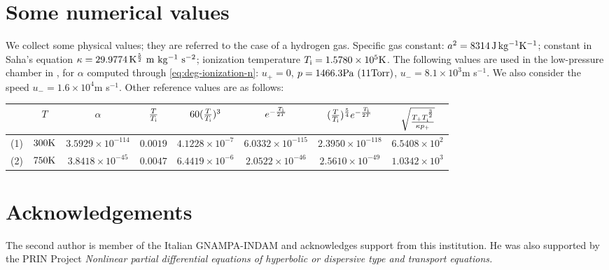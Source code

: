 \documentclass[10pt,a4paper]{article}
\numberwithin{equation}{section}
\newcommand{\Ti}{T_{\rm i}}
\begin{document}
\appendix
\section{Some numerical values}\label{sec:appendix_numerical_values}
\small We collect some physical values; they are referred to the case of a hydrogen gas.  Specific gas constant:  $a^2=8314 {\rm\, J\, kg}{}^{-1} {\rm K}{}^{-1}$; constant in Saha's equation $\kappa = 29.9774 {\rm\, K^\frac52\ m\ kg}{}^{-1}\ {\rm s}{}^{-2}$; ionization temperature $\Ti = 1.5780 \times 10^5{\rm K}$. The following values are used in the low-pressure chamber in \cite{Fukuda-Okasaka-Fujimoto}, for $\alpha$ computed through \eqref{eq:deg-ionization-n}: $u_+=0$, $p=1466.3 {\rm Pa}\ (11 {\rm Torr})$, $u_- = 8.1 \times 10^3$m s${}^{-1}$. We also consider the speed $u_- = 1.6 \times 10^4$m s${}^{-1}$. Other reference values are as follows:
%
\begin{center}
\begin{tabular}{c | c c c c c c c}
& $T$& $\alpha$ & $\frac{T}{T_{\rm i}}$ & $60(\frac{T}{T_{\rm i}})^3$ & $e^{-\frac{T_{\rm i}}{2T}}$ & $(\frac{T}{T_{\rm i}})^\frac54 e^{-\frac{T_{\rm i}}{2T}}$ &$\sqrt{\frac{T_{+}T_{\rm i}^{\frac{3}{2}}}{\kappa p_{+} }}$ 
\\[2mm]
\hline
(1) & $300{\rm K}$ & $3.5929 \times 10^{-114}$ & $0.0019$ &$4.1228\times 10^{-7}$ & $6.0332 \times 10^{-115}$ & $2.3950 \times 10^{-118}$&$6.5408\times 10^2$
\\[2mm]
(2) & $750{\rm K}$ & $3.8418 \times 10^{-45}$ & $0.0047$ &$6.4419\times 10^{-6}$ & $2.0522 \times 10^{-46}$ & $2.5610 \times 10^{-49}$&$1.0342\times 10^3$
\\
\hline
\end{tabular}
\end{center}


\section*{Acknowledgements}
The second author is member of the Italian GNAMPA-INDAM and acknowledges support from this institution. He was also supported by the PRIN Project {\em Nonlinear partial differential equations of hyperbolic or dispersive type and transport equations.}
\end{document}
